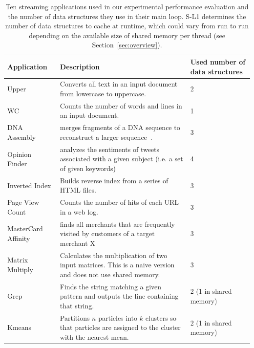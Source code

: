\begin{table}[ht]
{
\begin{center}
\resizebox{16cm}{1.9cm}
{
  \begin{tabular}{|p{2.8cm}|p{14.4cm}|p{3.5cm}|} \hline
         {\bf Application} & {\bf Description} &  {\bf Used number of data structures}\\
\hline
	  {Upper} &   {Converts all text in an input document from lowercase to uppercase.} &  {2}\\  \hline
	  {WC} &   {Counts the number of words and lines in an input document.} &  {1}\\ \hline
	  {DNA Assembly} & {merges fragments of a DNA sequence to reconstruct a larger sequence~\cite{dnaassembly}.} & {3}\\ \hline
	  {Opinion Finder} & {analyzes the sentiments of tweets associated with a given subject (i.e. a set of given keywords)~\cite{wilson2005opinionfinder}} &  {4}\\ \hline
	  {Inverted Index} & {Builds reverse index from a series of HTML files.} & {3}\\ \hline
	  {Page View Count} & {Counts the number of hits of each URL in a web log.} & {3}\\ \hline
          {MasterCard Affinity} & {finds all merchants that are frequently visited by customers of a target merchant X~\cite{mokhtari2014bigkernel}} & {3}\\ \hline
	  {Matrix Multiply} & {Calculates the multiplication of two input matrices. This is a naive version and does not use shared memory.} & {3}\\ \hline
	  {Grep} & {Finds the string matching a given pattern and outputs the line containing that string.} & {2 (1 in shared memory)}\\ \hline
	  {Kmeans} & {Partitions $n$ particles into $k$ clusters so that particles are assigned to the cluster with the nearest mean.} & {2 (1 in shared memory)}\\ \hline
  \end{tabular}
}
\end{center}
}
\vspace{-0.1cm}
\caption{\footnotesize\textnormal{Ten streaming applications used in our experimental performance evaluation
and the number of data structures they use in their main loop. S-L1 determines the number of data
structures to cache at runtime, which could vary from run to run depending on the available size of shared memory per
thread (see Section~\ref{sec:overview}).}} %
\label{tab:apps}
\vspace{-0.0cm}
\end{table}

